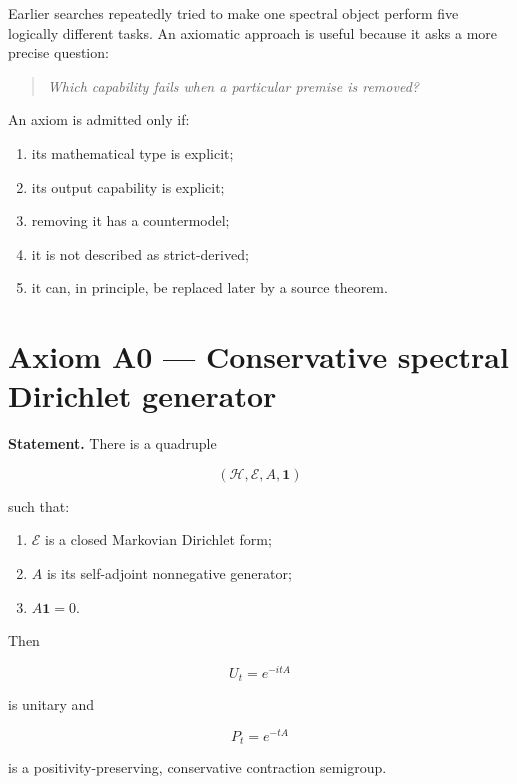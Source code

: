 \documentclass[11pt,a4paper,openany]{report}
\begin{document}
Earlier searches repeatedly tried to make one spectral object perform five logically different tasks. An axiomatic approach is useful because it asks a more precise question:

\begin{quote}\itshape
Which capability fails when a particular premise is removed?

\end{quote}

An axiom is admitted only if:

\begin{enumerate}
\item 
its mathematical type is explicit;

\item 
its output capability is explicit;

\item 
removing it has a countermodel;

\item 
it is not described as strict-derived;

\item 
it can, in principle, be replaced later by a source theorem.

\end{enumerate}

\section{Axiom A0 --- Conservative spectral Dirichlet generator}

\textbf{Statement.} There is a quadruple

\[
(\mathcal H,\mathcal E,A,\mathbf1)
\]

such that:

\begin{enumerate}
\item 
\(\mathcal E\) is a closed Markovian Dirichlet form;

\item 
\(A\) is its self-adjoint nonnegative generator;

\item 
\(A\mathbf1=0\).

\end{enumerate}

Then

\[
U_t=e^{-itA}
\]

is unitary and

\[
P_t=e^{-tA}
\]

is a positivity-preserving, conservative contraction semigroup.
\end{document}
